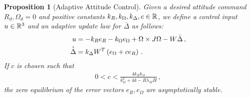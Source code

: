 \documentclass[letterpaper, 10 pt, conference]{ieeeconf}  %
\newtheorem{prop}{Proposition}
\begin{document}
\begin{prop}[Adaptive Attitude Control]\label{prop:adaptive_control}
Given  a desired attitude command \( R_d, \Omega_d = 0 \) and positive constants \( k_R, k_\Omega, k_\Delta, c \in \mathbb{R} \), we define a control input \( u \in \mathbb{R}^3\) and an adaptive update law for \( \bar{\Delta} \) as follows:
\begin{align}
	u &= - k_R e_R - k_\Omega e_\Omega + \Omega \times J \Omega - W \bar{\Delta} \, , \label{eqn:adaptive_control} \\
	\dot{\bar{\Delta}} &= k_\Delta W^T \left( e_\Omega + c e_R \right) \, . \label{eqn:delta_dot}
\end{align}
If \( c \) is chosen such that
\begin{gather}
	0 < c < \frac{4 k_R k_\Omega}{k_\Omega^2 + 4 k-R \lambda_M H} \, , \label{eqn:c_bound}
\end{gather}
  the zero equilibrium of the error vectors \( e_R, e_\Omega\) are asymptotically stable.
\end{prop}
\end{document}
